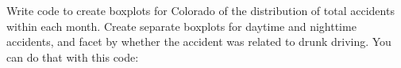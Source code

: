 \documentclass[]{book}
\makeatletter
\newenvironment{Shaded}{\begin{snugshade}}{\end{snugshade}}
\newcommand{\KeywordTok}[1]{\textcolor[rgb]{0.13,0.29,0.53}{\textbf{#1}}}
\newcommand{\DataTypeTok}[1]{\textcolor[rgb]{0.13,0.29,0.53}{#1}}
\newcommand{\StringTok}[1]{\textcolor[rgb]{0.31,0.60,0.02}{#1}}
\newcommand{\OperatorTok}[1]{\textcolor[rgb]{0.81,0.36,0.00}{\textbf{#1}}}
\newcommand{\NormalTok}[1]{#1}
\newenvironment{kframe}{%
\medskip{}
\setlength{\fboxsep}{.8em}
 \def\at@end@of@kframe{}%
 \ifinner\ifhmode%
  \def\at@end@of@kframe{\end{minipage}}%
  \begin{minipage}{\columnwidth}%
 \fi\fi%
 \def\FrameCommand##1{\hskip\@totalleftmargin \hskip-\fboxsep
 \colorbox{shadecolor}{##1}\hskip-\fboxsep
     \hskip-\linewidth \hskip-\@totalleftmargin \hskip\columnwidth}%
 \MakeFramed {\advance\hsize-\width
   \@totalleftmargin\z@ \linewidth\hsize
   \@setminipage}}%
 {\par\unskip\endMakeFramed%
 \at@end@of@kframe}
\renewenvironment{Shaded}{\begin{kframe}}{\end{kframe}}
\theoremstyle{definition}
\theoremstyle{definition}
\theoremstyle{definition}
\theoremstyle{remark}
\makeatother
\begin{document}
\begin{Shaded}
\end{Shaded}

Write code to create boxplots for Colorado of the distribution of total
accidents within each month. Create separate boxplots for daytime and
nighttime accidents, and facet by whether the accident was related to
drunk driving. You can do that with this code:
\end{document}
